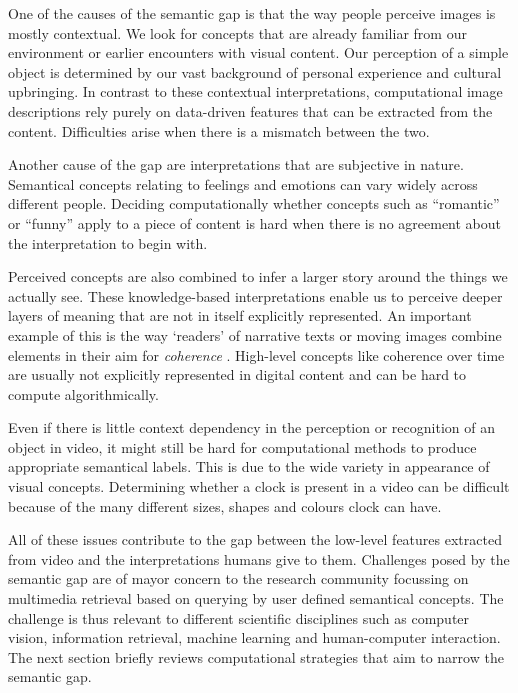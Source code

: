 One of the causes of the semantic gap is that the way people perceive images is mostly contextual\cite{Smeulders:2000tx}. We look for concepts that are already familiar from our environment or earlier encounters with visual content. Our perception of a simple object is determined by our vast background of personal experience and cultural upbringing. In contrast to these contextual interpretations, computational image descriptions rely purely on data-driven features that can be extracted from the content. Difficulties arise when there is a mismatch between the two.

Another cause of the gap are interpretations that are subjective in nature. Semantical concepts relating to feelings and emotions can vary widely across different people. Deciding computationally whether concepts such as ``romantic'' or ``funny'' apply to a piece of content is hard when there is no agreement about the interpretation to begin with.

Perceived concepts are also combined to infer a larger story around the things we actually see. These knowledge-based interpretations enable us to perceive deeper layers of meaning that are not in itself explicitly represented. An important example of this is the way `readers' of narrative texts or moving images combine elements in their aim for \emph{coherence}\cite[p.~38]{Bordwell:1985tz} \cite{gernsbacher1995coherence, Graesser:1994va}. High-level concepts like coherence over time are usually not explicitly represented in digital content and can be hard to compute algorithmically.

Even if there is little context dependency in the perception or recognition of an object in video, it might still be hard for computational methods to produce appropriate semantical labels. This is due to the wide variety in appearance of visual concepts. Determining whether a clock is present in a video can be difficult because of the many different sizes, shapes and colours clock can have. 

All of these issues contribute to the gap between the low-level features extracted from video and the interpretations humans give to them. Challenges posed by the semantic gap are of mayor concern to the research community focussing on multimedia retrieval based on querying by user defined semantical concepts. The challenge is thus relevant to different scientific disciplines such as computer vision, information retrieval, machine learning and human-computer interaction. The next section briefly reviews computational strategies that aim to narrow the semantic gap.

